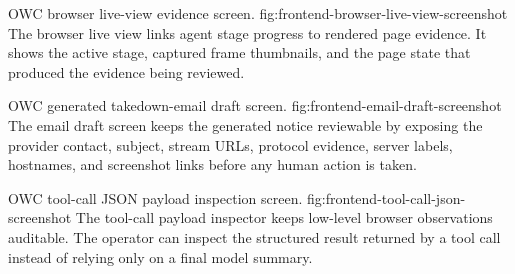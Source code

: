   {OWC browser live-view evidence screen.}
  {fig:frontend-browser-live-view-screenshot}
  {The browser live view links agent stage progress to rendered page evidence. It shows
  the active stage, captured frame thumbnails, and the page state that produced the
  evidence being reviewed.}

  {OWC generated takedown-email draft screen.}
  {fig:frontend-email-draft-screenshot}
  {The email draft screen keeps the generated notice reviewable by exposing the provider
  contact, subject, stream URLs, protocol evidence, server labels, hostnames, and
  screenshot links before any human action is taken.}

  {OWC tool-call JSON payload inspection screen.}
  {fig:frontend-tool-call-json-screenshot}
  {The tool-call payload inspector keeps low-level browser observations auditable. The
  operator can inspect the structured result returned by a tool call instead of relying
  only on a final model summary.}
